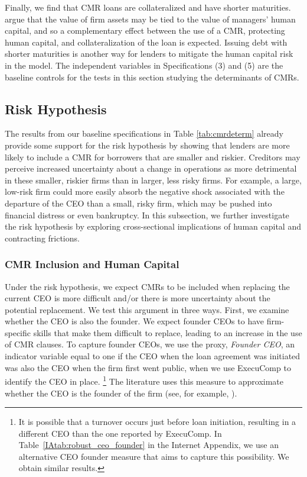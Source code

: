 \documentclass[a4paper,12pt]{article}
\begin{document}
Finally, we find that CMR loans are collateralized and have shorter maturities.
\citet{Hart_1994} argue that the value of firm assets may be tied to the value of managers' human capital, and so a complementary effect between the use of a CMR, protecting human capital, and collateralization of the loan is expected.
Issuing debt with shorter maturities is another way for lenders to mitigate the human capital risk in the \citet{Hart_1994} model.
The independent variables in Specifications (3) and (5) are the baseline controls for the tests in this section studying the determinants of CMRs.



\subsection{Risk Hypothesis}

The results from our baseline specifications in Table \ref{tab:cmrdeterm} already provide some support for the risk hypothesis by showing that lenders are more likely to include a CMR for borrowers that are smaller and riskier.
Creditors may perceive increased uncertainty about a change in operations as more detrimental in these smaller, riskier firms than in larger, less risky firms.
For example, a large, low-risk firm could more easily absorb the negative shock associated with the departure of the CEO than a small, risky firm, which may be pushed into financial distress or even bankruptcy.
In this subsection, we further investigate the risk hypothesis by exploring cross-sectional implications of human capital and contracting frictions.





\subsubsection{CMR Inclusion and Human Capital} \label{section:inclusion_humancap}

Under the risk hypothesis, we expect CMRs to be included when replacing the current CEO is more difficult and/or there is more uncertainty about the potential replacement.
We test this argument in three ways.
First, we examine whether the CEO is also the founder.
We expect founder CEOs to have firm-specific skills that make them difficult to replace, leading to an increase in the use of CMR clauses.
To capture founder CEOs, we use the  proxy, \textit{Founder CEO}, an indicator variable equal to one if the CEO when the loan agreement was initiated was also the CEO when the firm first went public, when we use ExecuComp to identify the CEO in place.%
  \footnote{It is possible that a turnover occurs just before loan initiation, resulting in a different CEO than the one reported by ExecuComp. In Table~\ref{IAtab:robust_ceo_founder} in the Internet Appendix, we use an alternative CEO founder measure that aims to capture this possibility. We obtain similar results.}
The literature uses this measure to approximate whether the CEO is the founder of the firm (see, for example, \citet{Bebchuk_2011}).
\end{document}
